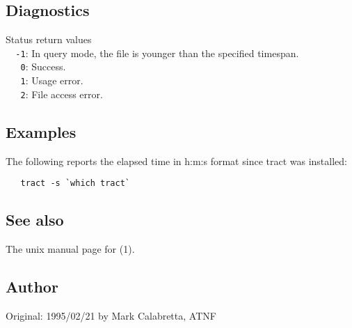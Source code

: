 \subsection*{Diagnostics}

Status return values
\\ \verb+  -1+:  In query mode, the file is younger than the specified timespan.
\\ \verb+   0+:  Success.
\\ \verb+   1+:  Usage error.
\\ \verb+   2+:  File access error.

\subsection*{Examples}

The following reports the elapsed time in h:m:s format since tract was
installed:

\begin{verbatim}
   tract -s `which tract`
\end{verbatim}

\subsection*{See also}

The unix manual page for (1).

\subsection*{Author}

Original: 1995/02/21 by Mark Calabretta, ATNF
